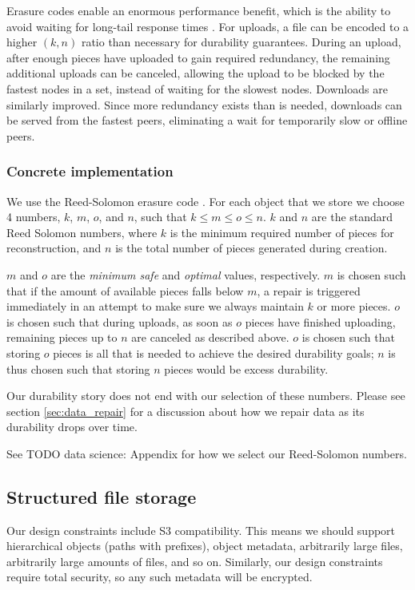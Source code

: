 \documentclass[a4paper,10pt]{article} \usepackage[utf8]{inputenc}
\newcommand{\todo}[1]{{\color{red} TODO #1 }}
\begin{document}
Erasure codes enable an enormous performance benefit, which is the ability to
avoid waiting for long-tail response times \cite{tail-at-scale}. For uploads, a
file can be encoded to a higher $(k, n)$ ratio than necessary for durability
guarantees. During an upload, after enough pieces have uploaded to gain required
redundancy, the remaining additional uploads can be canceled, allowing the
upload to be blocked by the fastest nodes in a set, instead of waiting for the
slowest nodes. Downloads are similarly improved. Since more redundancy exists
than is needed, downloads can be served from the fastest peers, eliminating a
wait for temporarily slow or offline peers.

\subsubsection{Concrete implementation}

We use the Reed-Solomon erasure code \cite{rs}. For each object that we store
we choose 4 numbers, $k$, $m$, $o$, and $n$, such that $k\le m\le o\le n$.
$k$ and $n$ are the standard Reed Solomon numbers, where $k$ is the minimum
required number of pieces for reconstruction, and $n$ is the total number of
pieces generated during creation.

$m$ and $o$ are the {\em minimum safe} and {\em optimal} values, respectively.
$m$ is chosen such that if the amount of available pieces falls below $m$, a
repair is triggered immediately in an attempt to make sure we always maintain
$k$ or more pieces. $o$ is chosen such that during uploads, as soon as $o$
pieces have finished uploading, remaining pieces up to $n$ are canceled as
described above. $o$ is chosen such that storing $o$ pieces is all that is
needed to achieve the desired durability goals; $n$ is thus chosen such that
storing $n$ pieces would be excess durability.

Our durability story does not end with our selection of these numbers.
Please see section \ref{sec:data_repair} for a discussion about how we repair
data as its durability drops over time.

See \todo{data science: Appendix} for how we select our Reed-Solomon numbers.

\subsection{Structured file storage}

Our design constraints include S3 compatibility. This means we should support
hierarchical objects (paths with prefixes), object metadata, arbitrarily large
files, arbitrarily large amounts of files, and so on. Similarly, our design
constraints require total security, so any such metadata will be encrypted.
\end{document}
